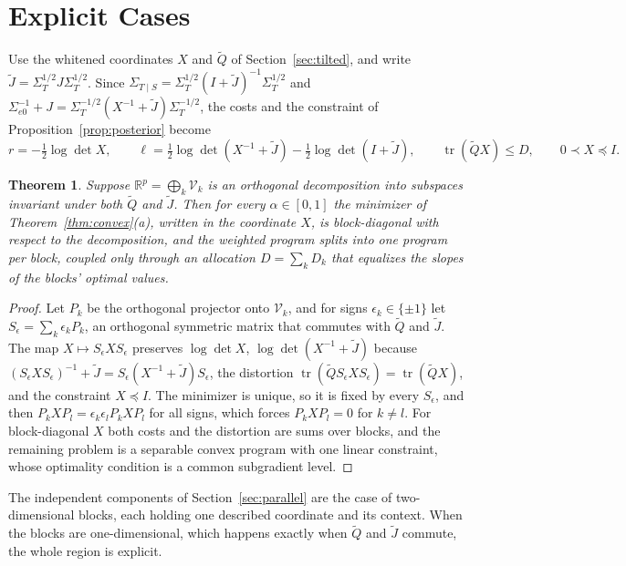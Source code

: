 \documentclass[11pt,onecolumn]{IEEEtran}
\newtheorem{theorem}{Theorem}
\newcommand{\R}{\mathbb{R}}
\newcommand{\tr}{\operatorname{tr}}
\newcommand{\Sez}{\Sigma_{e0}}
\newcommand{\Kc}{\Sigma_{T\mid S}}
\begin{document}
\section{Explicit Cases}
\label{sec:commuting}

Use the whitened coordinates $X$ and $\tilde Q$ of Section~\ref{sec:tilted}, and write
$\tilde J=\Sigma_T^{1/2}J\Sigma_T^{1/2}$. Since
$\Kc=\Sigma_T^{1/2}(I+\tilde J)^{-1}\Sigma_T^{1/2}$ and
$\Sez^{-1}+J=\Sigma_T^{-1/2}(X^{-1}+\tilde J)\Sigma_T^{-1/2}$, the costs and
the constraint of Proposition~\ref{prop:posterior} become
\begin{equation}
r=-\tfrac12\log\det X,\qquad
\ell=\tfrac12\log\det(X^{-1}+\tilde J)-\tfrac12\log\det(I+\tilde J),\qquad
\tr(\tilde QX)\le D,\qquad 0\prec X\preceq I .
\label{eq:whitened}
\end{equation}

\begin{theorem}\label{thm:decouple}
Suppose $\R^p=\bigoplus_k\mathcal V_k$ is an orthogonal decomposition into
subspaces invariant under both $\tilde Q$ and $\tilde J$. Then for every
$\alpha\in[0,1]$ the minimizer of Theorem~\ref{thm:convex}(a), written in
the coordinate $X$, is block-diagonal with respect to the decomposition,
and the weighted program splits into one program per block, coupled only
through an allocation $D=\sum_kD_k$ that equalizes the slopes of the
blocks' optimal values.
\end{theorem}

\begin{proof}
Let $P_k$ be the orthogonal projector onto $\mathcal V_k$, and for signs
$\epsilon_k\in\{\pm1\}$ let $S_\epsilon=\sum_k\epsilon_kP_k$, an orthogonal
symmetric matrix that commutes with $\tilde Q$ and $\tilde J$. The map
$X\mapsto S_\epsilon XS_\epsilon$ preserves $\log\det X$,
$\log\det(X^{-1}+\tilde J)$ because
$(S_\epsilon XS_\epsilon)^{-1}+\tilde J=S_\epsilon(X^{-1}+\tilde J)S_\epsilon$,
the distortion $\tr(\tilde QS_\epsilon XS_\epsilon)=\tr(\tilde QX)$, and the
constraint $X\preceq I$. The minimizer is unique, so it is fixed by every
$S_\epsilon$, and then $P_kXP_l=\epsilon_k\epsilon_lP_kXP_l$ for all signs,
which forces $P_kXP_l=0$ for $k\ne l$. For block-diagonal $X$ both costs
and the distortion are sums over blocks, and the remaining problem is a
separable convex program with one linear constraint, whose optimality
condition is a common subgradient level.
\end{proof}

The independent components of Section~\ref{sec:parallel} are the case of
two-dimensional blocks, each holding one described coordinate and its
context. When the blocks are one-dimensional, which happens exactly when
$\tilde Q$ and $\tilde J$ commute, the whole region is explicit.
\end{document}

